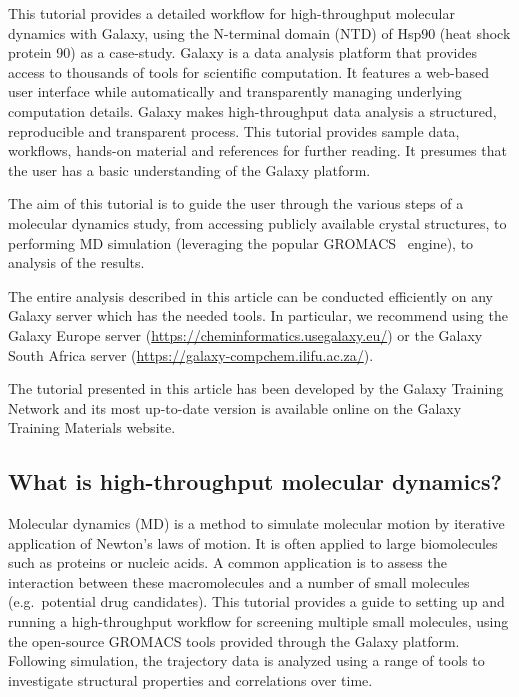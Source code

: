 \documentclass[twocolumn]{bmcart}%
\begin{document}
This tutorial provides a detailed workflow for high-throughput molecular dynamics with Galaxy, using the N-terminal domain (NTD) of Hsp90 (heat shock protein 90) as a case-study. Galaxy \cite{afgan_galaxy_2018} is a data analysis platform that provides access to thousands of tools for scientific computation. It features a web-based user interface while automatically and transparently managing underlying computation details. Galaxy makes high-throughput data analysis a structured, reproducible and transparent process. This tutorial provides sample data, workflows, hands-on material and references for further reading. It presumes that the user has a basic understanding of the Galaxy platform.

The aim of this tutorial is to guide the user through the various steps of a molecular dynamics study, from accessing publicly available crystal structures, to performing MD simulation (leveraging the popular GROMACS~\cite{abraham_gromacs_2015} engine), to analysis of the results.

The entire analysis described in this article can be conducted efficiently on any Galaxy server which has the needed tools. In particular, we recommend using the Galaxy Europe server
(\url{https://cheminformatics.usegalaxy.eu/}) or the Galaxy South Africa server (\url{https://galaxy-compchem.ilifu.ac.za/}).

The tutorial presented in this article has been developed by the Galaxy Training Network \cite{Batut2018} and its most up-to-date version is available online on the Galaxy Training Materials website\cite{gtn_comp}.


\subsection*{What is high-throughput molecular
dynamics?}\label{what-is-high-throughput-molecular-dynamics}

Molecular dynamics (MD) is a method to simulate molecular motion by
iterative application of Newton's laws of motion. It is often applied to
large biomolecules such as proteins or nucleic acids. A common
application is to assess the interaction between these macromolecules
and a number of small molecules (e.g.~potential drug candidates). This
tutorial provides a guide to setting up and running a high-throughput
workflow for screening multiple small molecules, using the open-source
GROMACS tools provided through the Galaxy platform. Following simulation, the trajectory data is analyzed using a range of tools to investigate structural properties and correlations over time.
\end{document}
